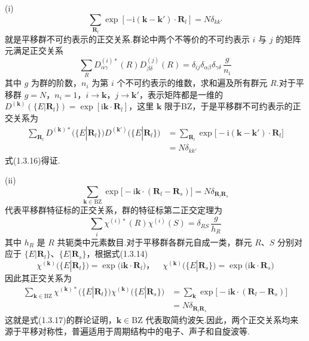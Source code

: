 (i)
\begin{equation}
  \sum_{\boldsymbol{R}_l}\exp[-\mathrm{i}(\boldsymbol{k}-\boldsymbol{k}')
  \cdot\boldsymbol{R}_l]=N\delta_{kk'}
\end{equation}
就是平移群不可约表示的正交关系.群论中两个不等价的不可约表示 $i$ 与 $j$ 的矩阵元满足正交关系
\begin{equation*}
  \sum_RD^{(i)*}_{\alpha\gamma}(R)D^{(j)}_{\beta\delta}(R)
  =\delta_{ij}\delta_{\alpha\beta}\delta_{\gamma\delta}\,\frac{g}{n_i}
\end{equation*}
其中 $g$ 为群的阶数，$n_i$ 为第 $i$ 个不可约表示的维数，求和遍及所有群元 $R$.对于平移群 $g=N$，$n_i=1$，$i\to\boldsymbol{k}$，$j\to\boldsymbol{k}'$，表示矩阵都是一维的 $D^{(\boldsymbol{k})}(\{E|\boldsymbol{R}_l\})=\exp[\mathrm{i}\boldsymbol{k}\cdot\boldsymbol{R}_l]$，这里 $\boldsymbol{k}$ 限于BZ，于是平移群不可约表示的正交关系为
\begin{equation*}
\begin{aligned}
  \sum_{\boldsymbol{R}_l}D^{(\boldsymbol{k})*}\bigl(\{E|\boldsymbol{R}_l\}\bigr)
  D^{(\boldsymbol{k}')}\bigl(\{E|\boldsymbol{R}_l\}\bigr)
  &=\sum_{\boldsymbol{R}_l}\exp\bigl[-\mathrm{i}(\boldsymbol{k}-\boldsymbol{k}')
  \cdot\boldsymbol{R}_l\bigr]\\
  &=N\delta_{kk'}
\end{aligned}
\end{equation*}
式(1.3.16)得证.

(ii)
\begin{equation}
  \sum_{\boldsymbol{k}\in\mathrm{BZ}}\exp\bigl[-\mathrm{i}\boldsymbol{k}
  \cdot(\boldsymbol{R}_l-\boldsymbol{R}_s)\bigr]
  =N\delta_{\boldsymbol{R}_l\boldsymbol{R}_s}
\end{equation}
代表平移群特征标的正交关系，群的特征标第二正交定理为
\begin{equation*}
  \sum_i\chi^{(i)*}(R)\chi^{(i)}(S)=\delta_{RS}\,\frac{g}{h_R}
\end{equation*}
其中 $h_R$ 是 $R$ 共轭类中元素数目.对于平移群各群元自成一类，群元 $R$、$S$ 分别对应于 $\{E|\boldsymbol{R}_l\}$、$\{E|\boldsymbol{R}_s\}$，根据式(1.3.14)
\begin{equation*}
  \chi^{(\boldsymbol{k})}\bigl(\{E|\boldsymbol{R}_l\}\bigr)
  =\exp\bigl(\mathrm{i}\boldsymbol{k}\cdot\boldsymbol{R}_l\bigr)\text{，}\quad
  \chi^{(\boldsymbol{k})}\bigl(\{E|\boldsymbol{R}_s\}\bigr)
  =\exp\bigl(\mathrm{i}\boldsymbol{k}\cdot\boldsymbol{R}_s\bigr)
\end{equation*}
因此其正交关系为
\begin{equation*}
\begin{aligned}
  \sum_{\boldsymbol{k}\in\mathrm{BZ}}
  \chi^{(\boldsymbol{k})*}\bigl(\{E|\boldsymbol{R}_l\}\bigr)
  \chi^{(\boldsymbol{k})}\bigl(\{E|\boldsymbol{R}_s\}\bigr)
  &=\sum_{\boldsymbol{k}}\exp\bigl[-\mathrm{i}\boldsymbol{k}
  \cdot(\boldsymbol{R}_l-\boldsymbol{R}_s)\bigr]\\
  &=N\delta_{\boldsymbol{R}_l\boldsymbol{R}_s}
\end{aligned}
\end{equation*}
这就是式(1.3.17)的群论证明，$\boldsymbol{k}\in\mathrm{BZ}$ 代表取简约波矢.因此，两个正交关系均来源于平移对称性，普遍适用于周期结构中的电子、声子和自旋波等.

